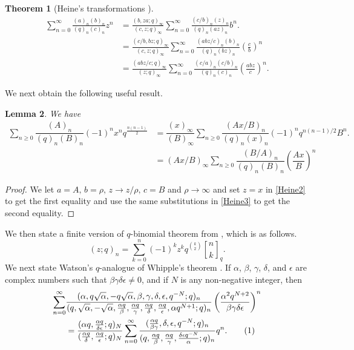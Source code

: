 \documentclass[11pt]{amsart}
\newtheorem{theorem}{Theorem}[section]
\newtheorem{lemma}[theorem]{Lemma}
\theoremstyle{definition}
\theoremstyle{remark}
\numberwithin{equation}{section}
\newcommand\numberthis{\addtocounter{equation}{1}\tag{\theequation}}
\begin{document}
\begin{theorem}[{Heine's transformations \cite[(1.4.4)--(1.4.6)]{GasperRahman2004}}]
\begin{align}
\sum_{n=0}^{\infty}\frac{(a)_n(b)_n}{(q)_n(c)_n}z^n&=\frac{(b,za;q)_{\infty}}{(c,z;q)_{\infty}}\sum_{n=0}^{\infty}\frac{(c/b)_n(z)_n}{(q)_n(az)_n}b^{n}.\label{eq:Heine1}\\
&=\frac{(c/b, bz;q)_{\infty}}{(c,z;q)_{\infty}}\sum_{n=0}^{\infty}\frac{(abz/c)_n(b)_n}{(q)_n(bz)_n}\left(\frac{c}{b}\right)^{n}\label{Heine2}\\
&=\frac{(abz/c;q)_{\infty}}{(z;q)_{\infty}}\sum_{n=0}^{\infty}\frac{(c/a)_n(c/b)_n}{(q)_n(c)_n}\left(\frac{abz}{c}\right)^{n}.\label{Heine3}
\end{align}
\end{theorem}
We next obtain the following useful result.
\begin{lemma}\label{lem1}
We have
\begin{align*}
 \sum_{n\ge 0}\dfrac{(A)_n}{(q)_n(B)_n}(-1)^n x^n q^{\frac{n(n-1)}{2}}&=\dfrac{(x)_\infty}{(B)_\infty}\sum_{n\ge 0}\dfrac{(Ax/B)_n}{(q)_n(x)_n}(-1)^nq^{n(n-1)/2}B^n.\\
 &=(Ax/B)_\infty\sum_{n\ge 0}\dfrac{(B/A)_n}{(q)_n(B)_n}\left(\dfrac{Ax}{B}\right)^n
 \end{align*}
\end{lemma}
\begin{proof}
 We let $a=A,\,b=\rho,\,z\to z/\rho,\,c=B$ and $\rho\to\infty$ and set $z=x$ in \eqref{Heine2} to get the first equality and use the same substitutions in \eqref{Heine3} to get the second equality.
\end{proof}
We then state a finite version of $q$-binomial theorem from \cite[p. $36$, $(3.3.6)$]{A}, which is as follows.
\begin{equation}\label{eq:FQbinom}
(z;q)_{n}=\sum_{k=0}^{n}(-1)^kz^{k}q^{\binom{k}{2}}{n\brack k}_{q}.
\end{equation}
We next state Watson's $q$-analogue of Whipple's theorem \cite[p. $81$, $(4.1.3)$]{AndrewsBerndt2009}. If $\alpha$, $\beta$, $\gamma$, $\delta$, and $\epsilon$ are complex numbers such that $\beta\gamma\delta\epsilon\neq 0$, and if $N$ is any non-negative integer, then
\begin{align*}
\sum\limits_{n=0}^{\infty}&\dfrac{(\alpha,q\sqrt{\alpha},-q\sqrt{\alpha},\beta,\gamma,\delta,\epsilon,q^{-N};q)_n}{(q,\sqrt{\alpha},-\sqrt{\alpha},\frac{\alpha q}{\beta},\frac{\alpha q}{\gamma},\frac{\alpha q}{\delta},\frac{\alpha q}{\epsilon},\alpha q^{N+1};q)_n}\left(\frac{\alpha^2q^{N+2}}{\beta\gamma\delta\epsilon}\right)^n\\
&= \dfrac{(\alpha q,\frac{\alpha q}{\delta\epsilon};q)_N}{(\frac{\alpha q}{\delta},\frac{\alpha q}{\epsilon};q)_N}\sum\limits_{n=0}^{\infty}\dfrac{(\frac{\alpha q}{\beta\gamma},\delta,\epsilon,q^{-N};q)_n}{(q,\frac{\alpha q}{\beta},\frac{\alpha q}{\gamma},\frac{\delta\epsilon q^{-N}}{\alpha};q)_n}q^n.\numberthis\label{eq23}
\end{align*}
\end{document}
